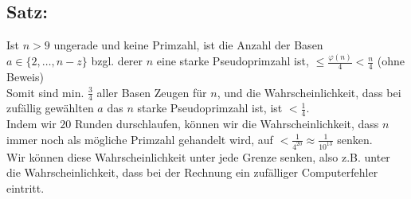 \subsection{Satz:}
Ist $n > 9$ ungerade und keine Primzahl, ist die Anzahl der Basen $a \in \{2, \dotsc, n-z\}$ bzgl. derer $n$ eine starke Pseudoprimzahl ist, $ \leq \frac{\varphi(n)}{4} < \frac{n}{4}$ (ohne Beweis)\\
Somit sind min. $\frac{3}{4}$ aller Basen Zeugen für $n$, und die Wahrscheinlichkeit, dass bei zufällig gewählten $a$ das $n$ starke Pseudoprimzahl ist, ist $< \frac{1}{4}$.\\
Indem wir $20$ Runden durschlaufen, können wir die Wahrscheinlichkeit, dass $n$ immer noch als mögliche Primzahl gehandelt wird, auf $< \frac{1}{4^{20}} \approx \frac{1}{10^{13}}$ senken.\\
Wir können diese Wahrscheinlichkeit unter jede Grenze senken, also z.B. unter die Wahrscheinlichkeit, dass bei der Rechnung ein zufälliger Computerfehler eintritt.
%
%
%